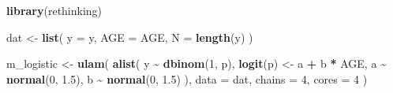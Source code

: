 \documentclass[
]{article}
\newenvironment{Shaded}{\begin{snugshade}}{\end{snugshade}}
\newcommand{\AttributeTok}[1]{\textcolor[rgb]{0.13,0.29,0.53}{#1}}
\newcommand{\DecValTok}[1]{\textcolor[rgb]{0.00,0.00,0.81}{#1}}
\newcommand{\FloatTok}[1]{\textcolor[rgb]{0.00,0.00,0.81}{#1}}
\newcommand{\FunctionTok}[1]{\textcolor[rgb]{0.13,0.29,0.53}{\textbf{#1}}}
\newcommand{\NormalTok}[1]{#1}
\newcommand{\OtherTok}[1]{\textcolor[rgb]{0.56,0.35,0.01}{#1}}
\newcommand{\SpecialCharTok}[1]{\textcolor[rgb]{0.81,0.36,0.00}{\textbf{#1}}}
\begin{document}
\begin{Shaded}
\begin{Highlighting}[]
\FunctionTok{library}\NormalTok{(rethinking)}

\NormalTok{dat }\OtherTok{\textless{}{-}} \FunctionTok{list}\NormalTok{(}
  \AttributeTok{y =}\NormalTok{ y,}
  \AttributeTok{AGE =}\NormalTok{ AGE,}
  \AttributeTok{N =} \FunctionTok{length}\NormalTok{(y)}
\NormalTok{)}

\NormalTok{m\_logistic }\OtherTok{\textless{}{-}} \FunctionTok{ulam}\NormalTok{(}
  \FunctionTok{alist}\NormalTok{(}
\NormalTok{    y }\SpecialCharTok{\textasciitilde{}} \FunctionTok{dbinom}\NormalTok{(}\DecValTok{1}\NormalTok{, p),}
    \FunctionTok{logit}\NormalTok{(p) }\OtherTok{\textless{}{-}}\NormalTok{ a }\SpecialCharTok{+}\NormalTok{ b }\SpecialCharTok{*}\NormalTok{ AGE,}
\NormalTok{    a }\SpecialCharTok{\textasciitilde{}} \FunctionTok{normal}\NormalTok{(}\DecValTok{0}\NormalTok{, }\FloatTok{1.5}\NormalTok{),}
\NormalTok{    b }\SpecialCharTok{\textasciitilde{}} \FunctionTok{normal}\NormalTok{(}\DecValTok{0}\NormalTok{, }\FloatTok{1.5}\NormalTok{)}
\NormalTok{  ),}
  \AttributeTok{data =}\NormalTok{ dat,}
  \AttributeTok{chains =} \DecValTok{4}\NormalTok{,}
  \AttributeTok{cores =} \DecValTok{4}
\NormalTok{)}
\end{Highlighting}
\end{Shaded}
\end{document}

